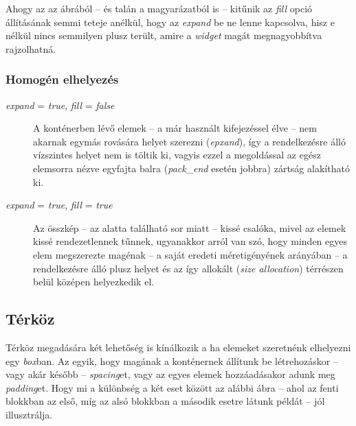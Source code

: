 Ahogy az az ábrából -- és talán a magyarázatból is -- kitűnik az \textit{fill} opció állításának semmi teteje anélkül, hogy az \textit{expand} be ne lenne kapcsolva, hisz e nélkül nincs semmilyen plusz terült, amire a \textit{widget} magát megnagyobbítva rajzolhatná.

\subsubsection{Homogén elhelyezés}

\begin{description}
 \item[\textit{expand} = \textit{true}, \textit{fill} = \textit{false}] A konténerben lévő elemek -- a már használt kifejezéssel élve -- nem akarnak egymás rovására helyet szerezni (\textit{epxand}), így a rendelkezésre álló vízszintes helyet nem is töltik ki, vagyis ezzel a megoldással az egész elemsorra nézve egyfajta balra (\textit{pack\_end} esetén jobbra) zártság alakítható ki.

 \item[\textit{expand} = \textit{true}, \textit{fill} = \textit{true}] Az összkép -- az alatta található sor miatt -- kissé csalóka, mivel az elemek kissé rendezetlennek tűnnek, ugyanakkor arról van szó, hogy minden egyes elem megszerezte magénak -- a saját eredeti méretigényének arányában -- a rendelkezésre álló plusz helyet és az így allokált (\textit{size allocation}) térrészen belül középen helyezkedik el.
\end{description}

\subsection{Térköz}

Térköz megadására két lehetőség is kínálkozik a ha elemeket szeretnénk elhelyezni egy \textit{box}ban. Az egyik, hogy magának a konténernek állítunk be létrehozáskor -- vagy akár később -- \textit{spacing}et, vagy az egyes elemek hozzáadásakor adunk meg \textit{padding}et. Hogy mi a különbség a két eset között az alábbi ábra -- ahol az fenti blokkban az első, míg az alsó blokkban a második esetre látunk példát -- jól illusztrálja.

